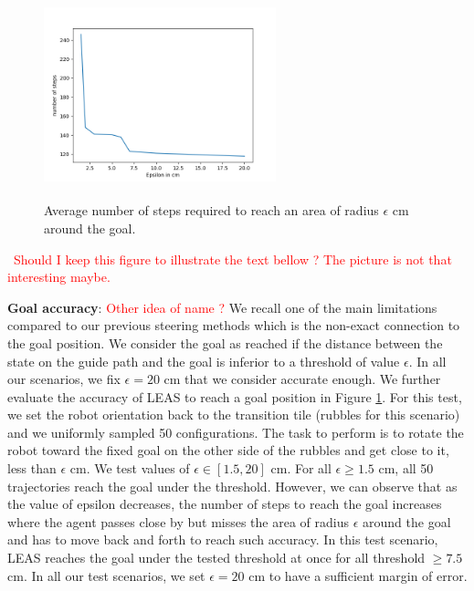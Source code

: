 \begin{figure}
    \centering
    \includegraphics[width=0.6\textwidth, height=6cm]{Figures/Chapter_LEAS/test_epsilon.png}
    \caption{Average number of steps required to reach an area of radius $\epsilon$ cm around the goal.}
    \label{fig:nb_steps_required}
\end{figure}\
\textcolor{red}{Should I keep this figure to illustrate the text bellow ? The picture is not that interesting maybe.}

\textbf{Goal accuracy}: \textcolor{red}{Other idea of name ?} 
We recall one of the main limitations compared to our previous steering methods which is the non-exact connection to the goal position. We consider the goal as reached if the distance between the state on the guide path and the goal is inferior to a threshold of value $\epsilon$. In all our scenarios, we fix $\epsilon = 20$ cm that we consider accurate enough.
We further evaluate the accuracy of LEAS to reach a goal position in Figure \ref{fig:nb_steps_required}. For this test, we set the robot orientation back to the transition tile (rubbles for this scenario) and we uniformly sampled 50 configurations. The task to perform is to rotate the robot toward the fixed goal on the other side of the rubbles and get close to it, less than $\epsilon$ cm.
We test values of $\epsilon \in [1.5, 20]$ cm. 
For all $\epsilon \geq 1.5$ cm, all 50 trajectories reach the goal under the threshold. However, we can observe that as the value of epsilon decreases, the number of steps to reach the goal increases where the agent passes close by but misses the area of radius $\epsilon$ around the goal and has to move back and forth to reach such accuracy. 
In this test scenario, LEAS reaches the goal under the tested threshold at once for all threshold $\geq 7.5 $ cm. In all our test scenarios, we set $\epsilon=20$ cm to have a sufficient margin of error.

